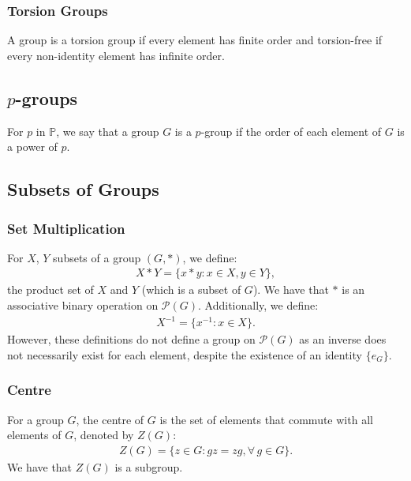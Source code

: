 \subsubsection{Torsion Groups}

A group is a torsion group if every element has finite order and torsion-free
if every non-identity element has infinite order.

\subsection{$p$-groups}

For $p$ in $\mathbb{P}$, we say that a group $G$ is a $p$-group if the order
of each element of $G$ is a power of $p$.

\newpage

\subsection{Subsets of Groups}

\subsubsection{Set Multiplication}

For $X$, $Y$ subsets of a group $(G, \ast)$, we define: \begin{align*}
    X \ast Y = \{x \ast y : x \in X, y \in Y\},
\end{align*} the product set of $X$ and $Y$ (which is a subset of $G$).
We have that $\ast$ is an associative binary operation on 
$\mathcal{P}(G)$. Additionally, we define: \begin{align*}
    X^{-1} = \{x^{-1} : x \in X\}.
\end{align*} However, these definitions do not define a group on
$\mathcal{P}(G)$ as an inverse does not necessarily exist for each
element, despite the existence of an identity $\{e_G\}$.

\subsubsection{Centre}

For a group $G$, the centre of $G$ is the set of elements that commute with all
elements of $G$, denoted by $Z(G)$: \begin{align*}
    Z(G) = \{z \in G : gz = zg, \forall \, g \in G\}.
\end{align*} We have that $Z(G)$ is a subgroup.

